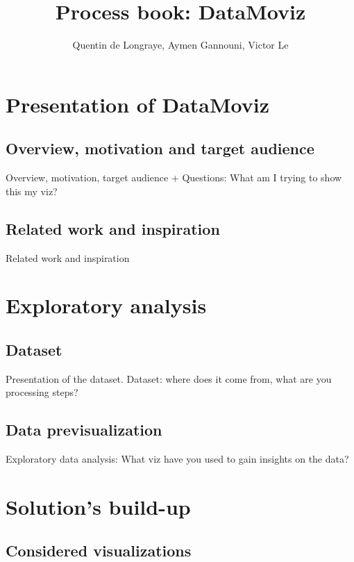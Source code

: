\documentclass[a4paper,10pt]{article}
\begin{document}
\title{Process book: DataMoviz}
\author{Quentin de Longraye, Aymen Gannouni, Victor Le}

\maketitle

\tableofcontents

\newpage

\section{Presentation of DataMoviz}

\subsection{Overview, motivation and target audience}

Overview, motivation, target audience
+ Questions: What am I trying to show this my viz?

\subsection{Related work and inspiration}

Related work and inspiration

\section{Exploratory analysis}

\subsection{Dataset}

Presentation of the dataset.
Dataset: where does it come from, what are you processing steps?

\subsection{Data previsualization}

Exploratory data analysis: What viz have you used to gain insights on the data?

\section{Solution's build-up}

\subsection{Considered visualizations}
\end{document}
